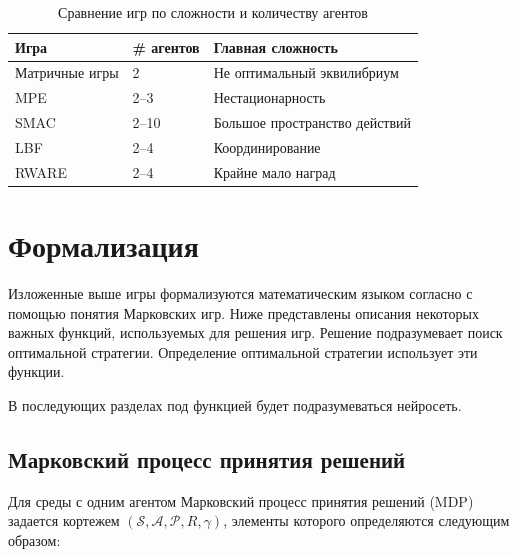 \begin{table}[H]
	\centering
	\caption{Сравнение игр по сложности и количеству агентов}
	\label{tab:games2}
	\begin{tabular}{@{}|l|l|l|@{}}
	\toprule
	Игра   &   \# агентов & Главная сложность             \\ \midrule
	Матричные игры &   2                   & Не оптимальный эквилибриум    \\
	MPE            &   2--3                 & Нестационарность              \\
	SMAC           &   2--10                & Большое пространство действий \\
	LBF            &   2--4                 & Координирование               \\
	RWARE          &   2--4                 & Крайне мало наград            \\ \bottomrule
	\end{tabular}
\end{table}

\section{Формализация}

Изложенные выше игры формализуются математическим языком согласно \cite{DBLP:journals/corr/abs-2011-00583} с помощью понятия Марковских игр.
Ниже представлены описания некоторых важных функций, используемых для решения игр.
Решение подразумевает поиск оптимальной стратегии. Определение оптимальной стратегии использует эти функции.

В последующих разделах под функцией будет подразумеваться нейросеть.

\subsection{Марковский процесс принятия решений} \label{sec:mdp}

Для среды с одним агентом Марковский процесс принятия решений (MDP) задается кортежем \( (\mathcal{S}, \mathcal{A}, \mathcal{P}, R, \gamma )\), элементы которого определяются следующим образом:

